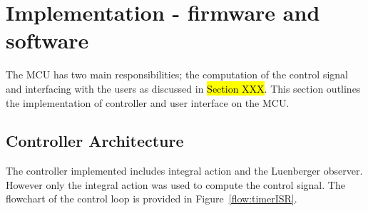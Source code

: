 \section{Implementation - firmware and software}
\begin{comment}
    \hl{talk about the limitation on speed  - discussed in discussion section}
    modules required on microcontroller for product to satisfy objectives of Section~\ref{sec:objectives}
    \begin{itemize}
        \item timer module for guaranteed execution of control loop regime at \hl{desired} frequency
        \item module to handle reading and processing of DC-DC converter circuit voltages
        \item timer module for microcontroller to transmit to user interface
        \item communication module for microcontroller to receive from user interface
    \end{itemize}
    \hl{in implementation section explain timer modules in detail (frequency, configuration etc.) (timer.c); explain UART.c; explain ADC.c; explain PWM.c; explain main.c}
\end{comment}

The MCU has two main responsibilities; the computation of the control signal and interfacing with the users as discussed in \hl{Section XXX}. This section outlines the implementation of controller and user interface on the MCU. 


\subsection{Controller Architecture}
The controller implemented includes integral action and the Luenberger observer. However only the integral action was used to compute the control signal. The flowchart of the control loop is provided in Figure~\ref{flow:timerISR}.

